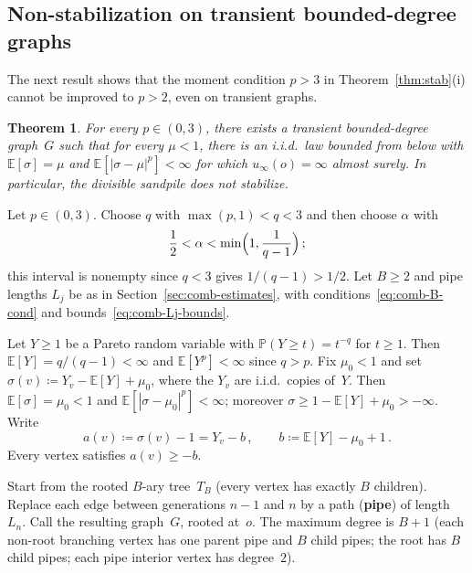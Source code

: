 \documentclass[aop]{imsart}
\theoremstyle{plain}
\newtheorem{theorem}{Theorem}[section]
\theoremstyle{definition}
\newcommand{\E}{\mathbb{E}}
\renewcommand{\P}{\mathbb{P}}
\begin{document}
	\subsection{Non-stabilization on transient bounded-degree graphs}\label{sec:transient-nonstab}
	
	The next result shows that the moment condition $p > 3$ in Theorem~\ref{thm:stab}(i) cannot be improved to $p > 2$, even on transient graphs.
	
	\begin{theorem}\label{thm:transient-nonstab}
		For every $p\in(0,3)$, there exists a transient bounded-degree graph~$G$ such that for every $\mu<1$, there is an i.i.d.\ law bounded from below with $\E[\sigma]=\mu$ and $\E[|\sigma-\mu|^p]<\infty$ for which $u_\infty(o)=\infty$ almost surely. In particular, the divisible sandpile does not stabilize.
	\end{theorem}
	
	Let $p\in(0,3)$. Choose $q$ with $\max(p,1)<q<3$ and then choose $\alpha$ with
	\begin{equation}
		\frac{1}{2}<\alpha<\min\Bigl(1,\frac{1}{q-1}\Bigr)\,;
	\end{equation}
	this interval is nonempty since $q<3$ gives $1/(q-1)>1/2$. Let $B\geq 2$ and pipe lengths $L_j$ be as in Section~\ref{sec:comb-estimates}, with conditions~\eqref{eq:comb-B-cond} and bounds~\eqref{eq:comb-Lj-bounds}.
	
	Let $Y\geq 1$ be a Pareto random variable with $\P(Y\geq t)=t^{-q}$ for $t\geq 1$. Then $\E[Y]=q/(q{-}1)<\infty$ and $\E[Y^p]<\infty$ since $q>p$. Fix $\mu_0 < 1$ and set $\sigma(v)\coloneqq Y_v-\E[Y]+\mu_0$, where the $Y_v$ are i.i.d.\ copies of~$Y$. Then $\E[\sigma]=\mu_0<1$ and $\E[|\sigma-\mu_0|^p]<\infty$; moreover $\sigma\geq 1-\E[Y]+\mu_0>-\infty$. Write
	\begin{equation}\label{eq:tr-ab}
		a(v)\coloneqq\sigma(v)-1=Y_v-b\,,
		\qquad
		b\coloneqq\E[Y]-\mu_0+1\,.
	\end{equation}
	Every vertex satisfies $a(v)\geq -b$.
	
	Start from the rooted $B$-ary tree~$T_B$ (every vertex has exactly $B$ children). Replace each edge between generations $n{-}1$ and $n$ by a path (\textbf{pipe}) of length~$L_n$. Call the resulting graph~$G$, rooted at~$o$. The maximum degree is $B{+}1$ (each non-root branching vertex has one parent pipe and $B$ child pipes; the root has $B$ child pipes; each pipe interior vertex has degree~$2$).
	
\end{document}
